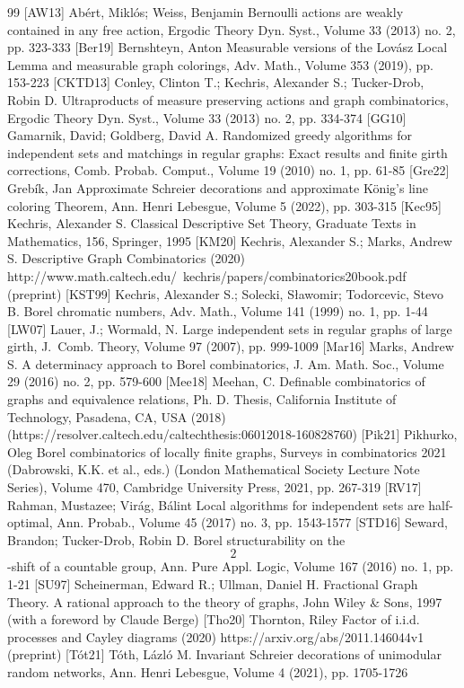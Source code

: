 \begin{thebibliography}{99}
 [AW13] Abért, Miklós; Weiss, Benjamin Bernoulli actions are weakly contained in any free action, Ergodic Theory Dyn. Syst., Volume 33 (2013) no. 2, pp. 323-333
 [Ber19] Bernshteyn, Anton Measurable versions of the Lovász Local Lemma and measurable graph colorings, Adv. Math., Volume 353 (2019), pp. 153-223
 [CKTD13] Conley, Clinton T.; Kechris, Alexander S.; Tucker-Drob, Robin D. Ultraproducts of measure preserving actions and graph combinatorics, Ergodic Theory Dyn. Syst., Volume 33 (2013) no. 2, pp. 334-374
 [GG10] Gamarnik, David; Goldberg, David A. Randomized greedy algorithms for independent sets and matchings in regular graphs: Exact results and finite girth corrections, Comb. Probab. Comput., Volume 19 (2010) no. 1, pp. 61-85
 [Gre22] Grebík, Jan Approximate Schreier decorations and approximate König’s line coloring Theorem, Ann. Henri Lebesgue, Volume 5 (2022), pp. 303-315
 [Kec95] Kechris, Alexander S. Classical Descriptive Set Theory, Graduate Texts in Mathematics, 156, Springer, 1995
 [KM20] Kechris, Alexander S.; Marks, Andrew S. Descriptive Graph Combinatorics (2020) http://www.math.caltech.edu/~kechris/papers/combinatorics20book.pdf (preprint)
 [KST99] Kechris, Alexander S.; Solecki, Sławomir; Todorcevic, Stevo B. Borel chromatic numbers, Adv. Math., Volume 141 (1999) no. 1, pp. 1-44
 [LW07] Lauer, J.; Wormald, N. Large independent sets in regular graphs of large girth, J. Comb. Theory, Volume 97 (2007), pp. 999-1009
 [Mar16] Marks, Andrew S. A determinacy approach to Borel combinatorics, J. Am. Math. Soc., Volume 29 (2016) no. 2, pp. 579-600
 [Mee18] Meehan, C. Definable combinatorics of graphs and equivalence relations, Ph. D. Thesis, California Institute of Technology, Pasadena, CA, USA (2018) (https://resolver.caltech.edu/caltechthesis:06012018-160828760)
 [Pik21] Pikhurko, Oleg Borel combinatorics of locally finite graphs, Surveys in combinatorics 2021 (Dabrowski, K.K. et al., eds.) (London Mathematical Society Lecture Note Series), Volume 470, Cambridge University Press, 2021, pp. 267-319
 [RV17] Rahman, Mustazee; Virág, Bálint Local algorithms for independent sets are half-optimal, Ann. Probab., Volume 45 (2017) no. 3, pp. 1543-1577
 [STD16] Seward, Brandon; Tucker-Drob, Robin D. Borel structurability on the $$2$$-shift of a countable group, Ann. Pure Appl. Logic, Volume 167 (2016) no. 1, pp. 1-21
 [SU97] Scheinerman, Edward R.; Ullman, Daniel H. Fractional Graph Theory. A rational approach to the theory of graphs, John Wiley \& Sons, 1997 (with a foreword by Claude Berge)
 [Tho20] Thornton, Riley Factor of i.i.d. processes and Cayley diagrams (2020) https://arxiv.org/abs/2011.146044v1 (preprint)
 [Tót21] Tóth, Lázló M. Invariant Schreier decorations of unimodular random networks, Ann. Henri Lebesgue, Volume 4 (2021), pp. 1705-1726
\end{thebibliography}
